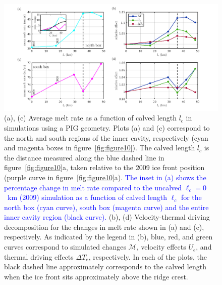 \documentclass[draft]{agujournal2019}
\newcommand{\blue}[1]{\textcolor{blue}{#1}}
\begin{document}
\begin{figure}
    \centering
    \includegraphics[width = \textwidth]{../make_figures/plots/figure13.png}
    \caption{(a), (c) Average melt rate as a function of calved length $l_c$ in simulations using a PIG geometry. Plots (a) and (c) correspond to the north and south regions of the inner cavity, respectively (cyan and magenta boxes in figure~\ref{fig:figure10}). The calved length $l_c$ is the distance measured along the blue dashed line in figure~\ref{fig:figure10}a, taken relative to the 2009 ice front position (purple curve in figure~\ref{fig:figure10}a). \blue{The inset in (a) shows the percentage change in melt rate compared to the uncalved $\ell_c =0$~km (2009) simulation as a function of calved length $\ell_c$ for the north box (cyan curve), south box (magenta curve) and the entire inner cavity region (black curve).} (b), (d) Velocity-thermal driving decomposition for the changes in melt rate shown in (a) and (c), respectively. As indicated by the legend in (b), blue, red, and green curves correspond to simulated changes $\mathcal{M}$, velocity effects $U_e$, and thermal driving effects $\Delta T_e$, respectively. In each of the plots, the black dashed line approximately corresponds to the calved length when the ice front sits approximately above the ridge crest.}\label{fig:figure13}
\end{figure}
\end{document}
